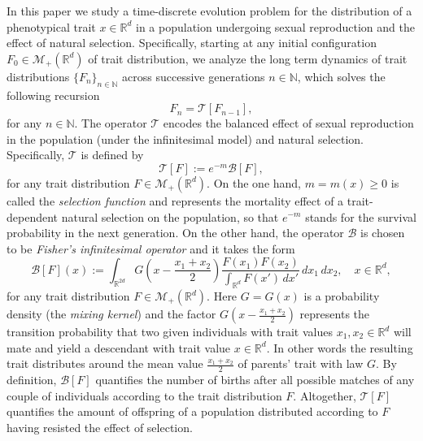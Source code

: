 \documentclass[reqno]{amsart}
\numberwithin{equation}{section}
\begin{document}
{In this paper we study a time-discrete evolution problem for the distribution of a phenotypical trait $x\in \mathbb{R}^d$ in a population undergoing sexual reproduction and the effect of natural selection. Specifically, starting at any initial configuration $F_0\in \mathcal{M}_+(\mathbb{R}^d)$ of trait distribution, we analyze the long term dynamics of trait distributions $\{F_n\}_{n\in \mathbb{N}}$ across successive generations $n\in \mathbb{N}$, which solves the following recursion
\begin{equation}\label{E-sexual-reproduction-time-discrete}
F_n=\mathcal{T}[F_{n-1}],
\end{equation}
for any $n\in \mathbb{N}$. The operator $\mathcal{T}$ encodes the balanced effect of sexual reproduction in the population (under the infinitesimal model) and natural selection. Specifically, $\mathcal{T}$ is defined by
\begin{equation}\label{E-sexual-reproduction-T-operator}
\mathcal{T}[F]:=e^{-m}\mathcal{B}[F],
\end{equation}
for any trait distribution $F\in \mathcal{M}_+(\mathbb{R}^d)$. On the one hand, $m=m(x)\geq 0$ is called the {\it selection function} and represents the mortality effect of a trait-dependent natural selection on the population, so that $e^{-m}$ stands for the survival probability in the next generation. On the other hand, the operator $\mathcal{B}$ is chosen to be {\it Fisher's infinitesimal operator} and it takes the form
\begin{equation}\label{E-sexual-reproduction-operator}
\mathcal{B}[F](x):=\int_{\mathbb{R}^{2d}}G\left(x-\frac{x_1+x_2}{2}\right)\frac{F(x_1)F(x_2)}{\int_{\mathbb{R}^d}F(x')\,dx'}\,dx_1\,dx_2,\quad x\in \mathbb{R}^d,
\end{equation}
for any trait distribution $F\in \mathcal{M}_+(\mathbb{R}^d)$. Here $G=G(x)$ is a probability density (the {\it mixing kernel}) and the factor $G(x-\frac{x_1+x_2}{2})$ represents the transition probability that two given individuals with trait values $x_1,x_2\in \mathbb{R}^d$ will mate and yield a descendant with trait value $x\in \mathbb{R}^d$. In other words the resulting trait distributes around the mean value $\frac{x_1+x_2}{2}$ of parents' trait with law $G$. By definition, $\mathcal{B}[F]$ quantifies the number of births after all possible matches of any couple of individuals according to the trait distribution $F$. Altogether, $\mathcal{T}[F]$ quantifies the amount of offspring of a population distributed according to $F$ having resisted the effect of selection.


}
\end{document}
